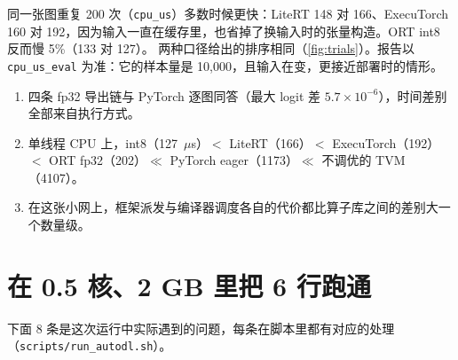 \documentclass[11pt,a4paper]{ctexart}
\begin{document}
同一张图重复 200 次（\texttt{cpu\_us}）多数时候更快：LiteRT 148 对 166、ExecuTorch 160 对 192，因为输入一直在缓存里，也省掉了换输入时的张量构造。ORT int8 反而慢 5\%（133 对 127）。
两种口径给出的排序相同（\cref{fig:trials}）。报告以 \texttt{cpu\_us\_eval} 为准：它的样本量是 10,000，且输入在变，更接近部署时的情形。

\begin{findingbox}[：三句话]
\begin{enumerate}
  \item 四条 fp32 导出链与 PyTorch 逐图同答（最大 logit 差 $5.7\times10^{-6}$），时间差别全部来自执行方式。
  \item 单线程 CPU 上，int8（127~$\mu$s）$<$ LiteRT（166）$<$ ExecuTorch（192）$<$ ORT fp32（202）$\ll$ PyTorch eager（1173）$\ll$ 不调优的 TVM（4107）。
  \item 在这张小网上，框架派发与编译器调度各自的代价都比算子库之间的差别大一个数量级。
\end{enumerate}
\end{findingbox}

\section{在 0.5 核、2 GB 里把 6 行跑通}\label{sec:pitfalls}

{\sloppy 下面 8 条是这次运行中实际遇到的问题，每条在脚本里都有对应的处理（\texttt{scripts/run\_autodl.sh}）。\par}
\end{document}
